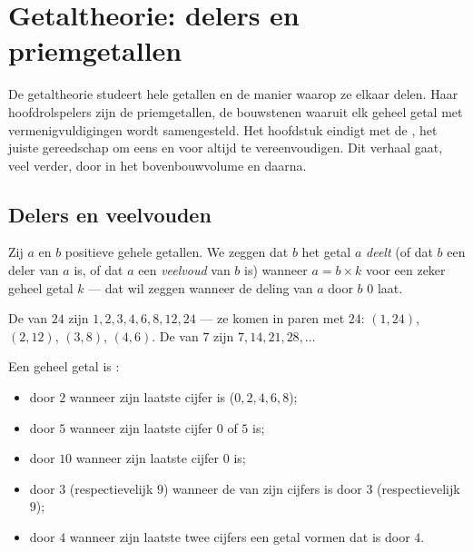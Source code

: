\chapter{Getaltheorie: delers en priemgetallen}\label{ch:g9:arith}

De getaltheorie studeert hele getallen en de manier waarop ze elkaar delen. Haar
hoofdrolspelers zijn de priemgetallen, de bouwstenen waaruit elk geheel getal met
vermenigvuldigingen wordt samengesteld. Het hoofdstuk eindigt met de , het juiste gereedschap om  eens en voor altijd te
vereenvoudigen. Dit verhaal gaat, veel verder, door in het bovenbouwvolume en
daarna.

\section{Delers en veelvouden}

\begin{definition}\label{def:g9:arith:divisor}
Zij $a$ en $b$ positieve gehele getallen. We zeggen dat $b$ het getal $a$
\emph{deelt} (of dat $b$ een deler van $a$ is, of dat $a$ een
\emph{veelvoud} van $b$ is) wanneer $a = b \times k$ voor een
zeker geheel getal $k$ --- dat wil zeggen wanneer de deling van $a$ door $b$ 
$0$ laat.
\end{definition}

\begin{example}
De  van $24$ zijn $1, 2, 3, 4, 6, 8, 12, 24$ --- ze komen in paren met
 $24$: $(1,24)$, $(2,12)$, $(3,8)$, $(4,6)$. De  van $7$ zijn
$7, 14, 21, 28, \dots$
\end{example}

\begin{proposition}[Deelbaarheidsregels]\label{prop:g9:arith:rules}
Een geheel getal is :
\begin{itemize}
  \item door $2$ wanneer zijn laatste cijfer  is ($0, 2, 4, 6, 8$);
  \item door $5$ wanneer zijn laatste cijfer $0$ of $5$ is;
  \item door $10$ wanneer zijn laatste cijfer $0$ is;
  \item door $3$ (respectievelijk $9$) wanneer de  van zijn cijfers  is
        door $3$ (respectievelijk $9$);
  \item door $4$ wanneer zijn laatste twee cijfers een getal vormen dat 
        is door $4$.
\end{itemize}
\end{proposition}
\admitted

